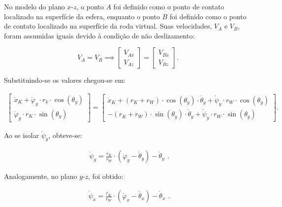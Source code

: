 No modelo do plano $x$-$z$, o ponto $A$ foi definido como o ponto de contato localizado na superfície da esfera, enquanto o ponto $B$ foi definido como o ponto de contato localizado na superfície da roda virtual. Suas velocidades, \( V_A \) e \( V_B \), foram assumidas iguais devido à condição de não deslizamento:

\begin{equation*}
    V_A = V_B \implies 
    \begin{bmatrix}
    V_{Ax} \\
    V_{Az}
    \end{bmatrix} = 
    \begin{bmatrix}
    V_{Bx} \\
    V_{Bz}
    \end{bmatrix}.
\end{equation*}

Substituindo-se os valores chegou-se em:

\begin{equation*}
    \begin{aligned}
        \begin{bmatrix}
        \dot x_K + \dot \varphi_y \cdot r_k \cdot \cos(\theta_y) \\
        \dot \varphi_y \cdot r_K \cdot \sin(\theta_y)
        \end{bmatrix}=
        \begin{bmatrix}
        \dot x_K + (r_K + r_W) \cdot \cos(\theta_y) \cdot \dot \theta_y + \dot \psi_y \cdot r_W \cdot \cos(\theta_y) \\
        - (r_K + r_W) \cdot \sin(\theta_y) \cdot \dot \theta_y + \dot \psi_y \cdot r_W \cdot \sin(\theta_y)
        \end{bmatrix}.
    \end{aligned}
\end{equation*}

Ao se isolar $\dot \psi_y$, obteve-se:

\begin{equation}
    \label{eq:14}
    \begin{aligned}
        \dot \psi_y = \frac{r_K}{r_W} \cdot (\dot \varphi_y - \dot \theta_y) - \dot \theta_y
    \end{aligned}.
\end{equation}

Analogamente, no plano $y$-$z$, foi obtido:

\begin{equation}
    \label{eq:15}
    \begin{aligned}
        \dot \psi_x = \frac{r_K}{r_W} \cdot (\dot \varphi_x - \dot \theta_x) - \dot \theta_x
    \end{aligned}.
\end{equation}

